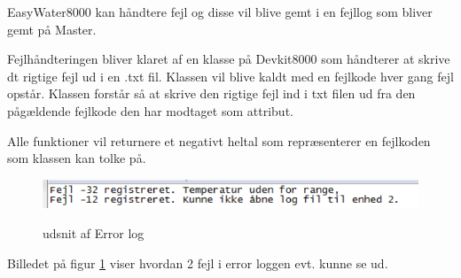 
EasyWater8000 kan håndtere fejl og disse vil blive gemt i en fejllog som bliver gemt på Master. 

Fejlhåndteringen bliver klaret af en klasse på Devkit8000 som håndterer at skrive dt rigtige fejl ud i en .txt fil. Klassen vil blive kaldt med en fejlkode hver gang fejl opstår. Klassen forstår så at skrive den rigtige fejl ind i txt filen ud fra den pågældende fejlkode den har modtaget som attribut. 

Alle funktioner vil returnere et negativt heltal som repræsenterer en fejlkoden som klassen kan tolke på.

\begin{figure}[htbp] \centering
{\includegraphics[scale=0.7]{filer/pics/Errortxt}}
\caption{udsnit af Error log}
\label{fig:ErrorLog}
\end{figure}

Billedet på figur \ref{fig:ErrorLog} viser hvordan 2 fejl i error loggen evt. kunne se ud.